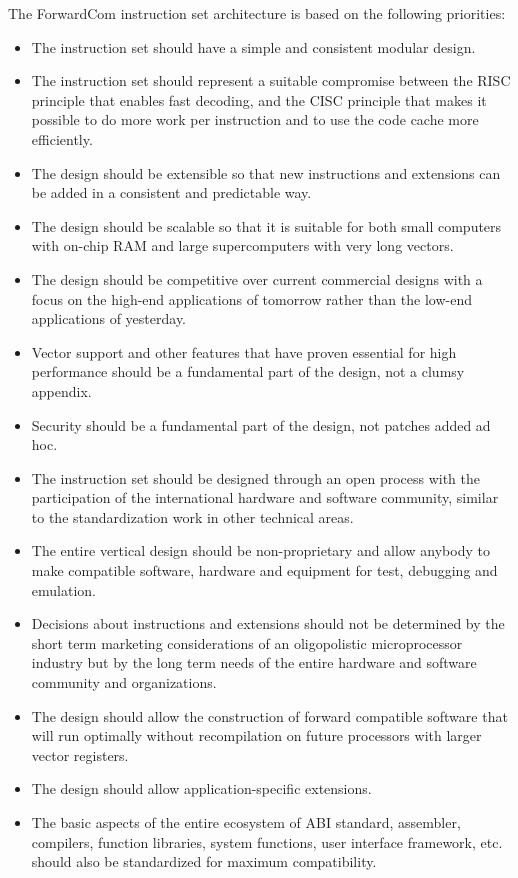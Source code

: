 \documentclass[forwardcom.tex]{subfiles}
\begin{document}
The ForwardCom instruction set architecture is based on the following priorities:
\begin{itemize}
\item The instruction set should have a simple and consistent modular design.
\item The instruction set should represent a suitable compromise between the RISC principle that enables fast decoding, and the CISC principle that makes it possible to do more work per instruction and to use the code cache more efficiently.
\item The design should be extensible so that new instructions and extensions can be added in a consistent and predictable way.
\item The design should be scalable so that it is suitable for both small computers with on-chip RAM and large supercomputers with very long vectors.
\item The design should be competitive over current commercial designs with a focus on the high-end applications of tomorrow rather than the low-end applications of yesterday.
\item Vector support and other features that have proven essential for high performance should be a fundamental part of the design, not a clumsy appendix.
\item Security should be a fundamental part of the design, not patches added ad hoc.
\item The instruction set should be designed through an open process with the participation of the international hardware and software community, similar to the standardization work in other technical areas.
\item The entire vertical design should be non-proprietary and allow anybody to make compatible software, hardware and equipment for test, debugging and emulation.
\item Decisions about instructions and extensions should not be determined by the short term marketing considerations of an oligopolistic microprocessor industry but by the long term needs of the entire hardware and software community and organizations.
\item The design should allow the construction of forward compatible software that will run optimally without recompilation on future processors with larger vector registers.
\item The design should allow application-specific extensions.
\item The basic aspects of the entire ecosystem of ABI standard, assembler, compilers, function libraries, system functions, user interface framework, etc. should also be standardized for maximum compatibility.
\end{itemize}
\end{document}
